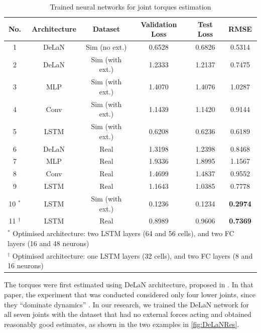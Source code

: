 \begin{table}
    \centering
    \caption{Trained neural networks for joint torques estimation}
    \label{tab:NetworksFrankaTorqueRes}
    \begin{tabular}{cccccc}
        \toprule
        \textbf{No.} & \textbf{Architecture} & \textbf{Dataset} & \textbf{Validation Loss} & \textbf{Test Loss} & \textbf{RMSE} \\
        \midrule
        1 & DeLaN & Sim (no ext.) & 0.6528 & 0.6826 & 0.5314 \\ %
        2 & DeLaN & Sim (with ext.) & 1.2333 & 1.2137 & 0.7475 \\ %
        3 & MLP & Sim (with ext.) & 1.4070 & 1.4076 & 1.0287 \\ %
        4 & Conv & Sim (with ext.) & 1.1439 & 1.1420 & 0.9144 \\ %
        5 & LSTM & Sim (with ext.) & 0.6208 & 0.6236 & 0.6189\\ %
        \midrule
        6 & DeLaN & Real & 1.3198 & 1.2398 & 0.8468\\ %
        7 & MLP & Real & 1.9336 & 1.8995 & 1.1567\\%
        8 & Conv & Real & 1.4699 & 1.4837 & 0.9552\\ %
        9 & LSTM & Real & 1.1643 & 1.0385 & 0.7778\\ %
        \midrule
        10 $^*$ & LSTM & Sim (with ext.) & 0.1236 & 0.1234 & \textbf{0.2974}\\ %
        11 $^\dagger$ & LSTM & Real & 0.8989 & 0.9606 & \textbf{0.7369} \\ %
        \bottomrule
        \multicolumn{6}{l}{\footnotesize{$^*$ Optimised architecture: two LSTM layers (64 and 56 cells), and two FC layers (16 and 48 neurons)}}\\
        \multicolumn{6}{l}{\footnotesize{$^\dagger$ Optimised architecture: one LSTM layers (32 cells), and two FC layers (8 and 16 neurons)}}
    \end{tabular}
\end{table}

The torques were first estimated using DeLaN architecture, proposed in \cite{Lutter2019}. In that paper, the experiment that was conducted considered only four lower joints, since they ``dominate dynamics'' \cite{Lutter2019}. In our research, we trained the DeLaN network for all seven joints with the dataset that had no external forces acting and obtained reasonably good estimates, as shown in the two examples in \cref{fig:DeLaNRes}.

